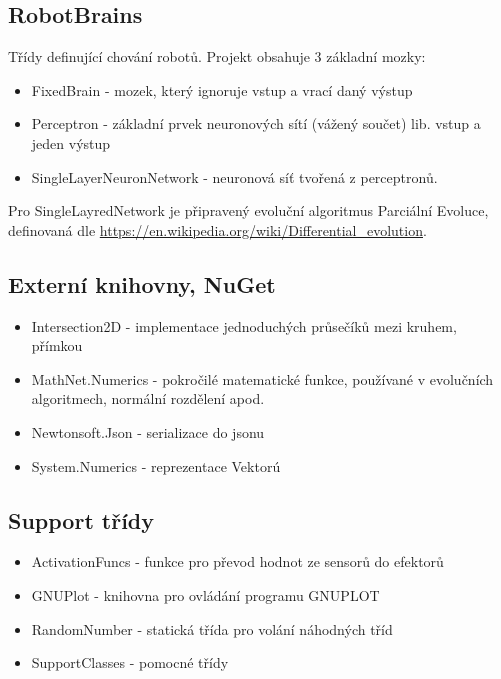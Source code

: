 \documentclass[12pt, oneside]{article}
\begin{document}
\subsection{RobotBrains} 
Třídy definující chování robotů. Projekt obsahuje 3 základní mozky:
\begin{itemize}
\item FixedBrain - mozek, který ignoruje vstup a vrací daný výstup 
\item Perceptron - základní prvek neuronových sítí (vážený součet)  lib. vstup a jeden výstup
\item SingleLayerNeuronNetwork - neuronová síť tvořená z perceptronů.
\end{itemize}

Pro SingleLayredNetwork je připravený evoluční algoritmus Parciální Evoluce, definovaná dle  \url{https://en.wikipedia.org/wiki/Differential_evolution}.

\subsection{Externí knihovny, NuGet}
\begin{itemize}
\item Intersection2D - implementace jednoduchých průsečíků mezi kruhem, přímkou 
\item MathNet.Numerics - pokročilé matematické funkce, používané v evolučních  algoritmech, normální rozdělení apod.
\item Newtonsoft.Json - serializace do jsonu
\item System.Numerics - reprezentace Vektorú

\end{itemize} 
\subsection{Support třídy} 
\begin{itemize}
\item ActivationFuncs - funkce pro převod hodnot ze sensorů do efektorů
\item GNUPlot - knihovna pro ovládání programu GNUPLOT 
\item RandomNumber  - statická třída pro volání náhodných tříd
\item SupportClasses - pomocné třídy

\end{itemize}
\end{document}
